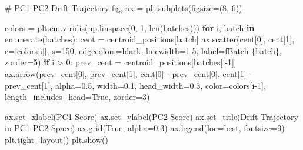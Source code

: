 \documentclass[
  letterpaper,
  DIV=11,
  numbers=noendperiod]{scrartcl}
\newenvironment{Shaded}{\begin{snugshade}}{\end{snugshade}}
\newcommand{\BuiltInTok}[1]{\textcolor[rgb]{0.00,0.23,0.31}{#1}}
\newcommand{\CommentTok}[1]{\textcolor[rgb]{0.37,0.37,0.37}{#1}}
\newcommand{\ControlFlowTok}[1]{\textcolor[rgb]{0.00,0.23,0.31}{\textbf{#1}}}
\newcommand{\DecValTok}[1]{\textcolor[rgb]{0.68,0.00,0.00}{#1}}
\newcommand{\FloatTok}[1]{\textcolor[rgb]{0.68,0.00,0.00}{#1}}
\newcommand{\KeywordTok}[1]{\textcolor[rgb]{0.00,0.23,0.31}{\textbf{#1}}}
\newcommand{\NormalTok}[1]{\textcolor[rgb]{0.00,0.23,0.31}{#1}}
\newcommand{\OperatorTok}[1]{\textcolor[rgb]{0.37,0.37,0.37}{#1}}
\newcommand{\SpecialCharTok}[1]{\textcolor[rgb]{0.37,0.37,0.37}{#1}}
\newcommand{\SpecialStringTok}[1]{\textcolor[rgb]{0.13,0.47,0.30}{#1}}
\newcommand{\StringTok}[1]{\textcolor[rgb]{0.13,0.47,0.30}{#1}}
\newcommand{\VariableTok}[1]{\textcolor[rgb]{0.07,0.07,0.07}{#1}}
\renewenvironment{Shaded}{%
  \begin{tcolorbox}[%
    enhanced,%
    colback=codebg,%
    colframe=codebg,%
    borderline west={3pt}{0pt}{sectionblue},%
    fontupper=\small\ttfamily,%
    boxrule=0pt,%
    arc=0pt,%
    boxsep=5pt,%
    left=2mm,%
    right=2mm,%
    top=2mm,%
    bottom=2mm%
  ]%
}{%
  \end{tcolorbox}%
}
\begin{document}
\begin{Shaded}
\begin{Highlighting}[]
\CommentTok{\# PC1{-}PC2 Drift Trajectory}
\NormalTok{fig, ax }\OperatorTok{=}\NormalTok{ plt.subplots(figsize}\OperatorTok{=}\NormalTok{(}\DecValTok{8}\NormalTok{, }\DecValTok{6}\NormalTok{))}

\NormalTok{colors }\OperatorTok{=}\NormalTok{ plt.cm.viridis(np.linspace(}\DecValTok{0}\NormalTok{, }\DecValTok{1}\NormalTok{, }\BuiltInTok{len}\NormalTok{(batches)))}
\ControlFlowTok{for}\NormalTok{ i, batch }\KeywordTok{in} \BuiltInTok{enumerate}\NormalTok{(batches):}
\NormalTok{    cent }\OperatorTok{=}\NormalTok{ centroid\_positions[batch]}
\NormalTok{    ax.scatter(cent[}\DecValTok{0}\NormalTok{], cent[}\DecValTok{1}\NormalTok{], c}\OperatorTok{=}\NormalTok{[colors[i]], s}\OperatorTok{=}\DecValTok{150}\NormalTok{, }
\NormalTok{               edgecolors}\OperatorTok{=}\StringTok{\textquotesingle{}black\textquotesingle{}}\NormalTok{, linewidth}\OperatorTok{=}\FloatTok{1.5}\NormalTok{, label}\OperatorTok{=}\SpecialStringTok{f\textquotesingle{}Batch }\SpecialCharTok{\{}\NormalTok{batch}\SpecialCharTok{\}}\SpecialStringTok{\textquotesingle{}}\NormalTok{, zorder}\OperatorTok{=}\DecValTok{5}\NormalTok{)}
    \ControlFlowTok{if}\NormalTok{ i }\OperatorTok{\textgreater{}} \DecValTok{0}\NormalTok{:}
\NormalTok{        prev\_cent }\OperatorTok{=}\NormalTok{ centroid\_positions[batches[i}\OperatorTok{{-}}\DecValTok{1}\NormalTok{]]}
\NormalTok{        ax.arrow(prev\_cent[}\DecValTok{0}\NormalTok{], prev\_cent[}\DecValTok{1}\NormalTok{], }
\NormalTok{                 cent[}\DecValTok{0}\NormalTok{] }\OperatorTok{{-}}\NormalTok{ prev\_cent[}\DecValTok{0}\NormalTok{], cent[}\DecValTok{1}\NormalTok{] }\OperatorTok{{-}}\NormalTok{ prev\_cent[}\DecValTok{1}\NormalTok{],}
\NormalTok{                 alpha}\OperatorTok{=}\FloatTok{0.5}\NormalTok{, width}\OperatorTok{=}\FloatTok{0.1}\NormalTok{, head\_width}\OperatorTok{=}\FloatTok{0.3}\NormalTok{, }
\NormalTok{                 color}\OperatorTok{=}\NormalTok{colors[i}\OperatorTok{{-}}\DecValTok{1}\NormalTok{], length\_includes\_head}\OperatorTok{=}\VariableTok{True}\NormalTok{, zorder}\OperatorTok{=}\DecValTok{3}\NormalTok{)}

\NormalTok{ax.set\_xlabel(}\StringTok{\textquotesingle{}PC1 Score\textquotesingle{}}\NormalTok{)}
\NormalTok{ax.set\_ylabel(}\StringTok{\textquotesingle{}PC2 Score\textquotesingle{}}\NormalTok{)}
\NormalTok{ax.set\_title(}\StringTok{\textquotesingle{}Drift Trajectory in PC1{-}PC2 Space\textquotesingle{}}\NormalTok{)}
\NormalTok{ax.grid(}\VariableTok{True}\NormalTok{, alpha}\OperatorTok{=}\FloatTok{0.3}\NormalTok{)}
\NormalTok{ax.legend(loc}\OperatorTok{=}\StringTok{\textquotesingle{}best\textquotesingle{}}\NormalTok{, fontsize}\OperatorTok{=}\DecValTok{9}\NormalTok{)}
\NormalTok{plt.tight\_layout()}
\NormalTok{plt.show()}
\end{Highlighting}
\end{Shaded}
\end{document}

